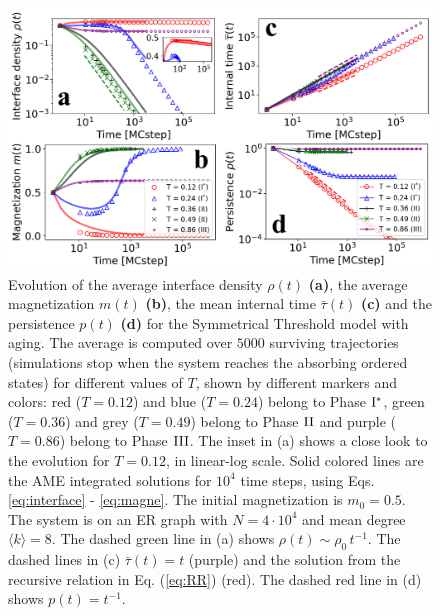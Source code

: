 \begin{figure}[ht]
        \centering \captionsetup{font=sf}
        \includegraphics[width=\textwidth]{Figs/Aging_STM/FIG6_THESIS.pdf}
        \caption[Symmetrical threshold model with aging dynamics in random networks]{\label{fig:evolution_random_aging} Evolution of the average interface density $\rho(t)$ \textbf{(a)}, the average magnetization $m(t)$ \textbf{(b)}, the mean internal time $\bar{\tau}(t)$ \textbf{(c)} and the persistence $p(t)$ \textbf{(d)} for the Symmetrical Threshold model with aging. The average is computed over $5000$ surviving trajectories (simulations stop when the system reaches the absorbing ordered states) for different values of $T$, shown by different markers and colors: red ($T = 0.12$) and blue ($T = 0.24$) belong to Phase ${\rm I}^{*}$, green ($T = 0.36$) and grey ($T = 0.49$) belong to Phase ${\rm II}$ and purple ($T = 0.86$) belong to Phase ${\rm III}$. The inset in (a) shows a close look to the evolution for $T = 0.12$, in linear-log scale. Solid colored lines are the AME integrated solutions for $10^4$ time steps, using Eqs. \ref{eq:interface} - \ref{eq:magne}. The initial magnetization is $m_0 = 0.5$. The system is on an ER graph with $N = 4 \cdot 10^4$ and mean degree $\langle k \rangle = 8$. The dashed green line in (a) shows $\rho(t) \sim \rho_0 \, t^{-1}$. The dashed lines in (c) $\bar{\tau}(t) = t$ (purple) and the solution from the recursive relation in Eq. (\ref{eq:RR}) (red). The dashed red line in (d) shows $p(t) = t^{-1}$.
        }
\end{figure}

